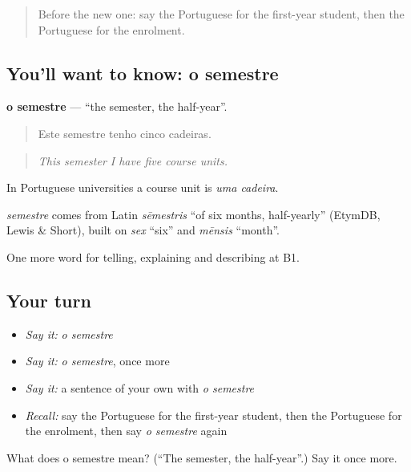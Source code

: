 \begin{quote}
Before the new one: say the Portuguese for the first-year student, then the Portuguese for the enrolment.
\end{quote}

\subsection*{You'll want to know: o semestre}
\textbf{o semestre} — \textquotedblleft{}the semester, the half-year\textquotedblright{}.

\begin{quote}
Este semestre tenho cinco cadeiras.
\end{quote}

\begin{quote}
\emph{This semester I have five course units.}
\end{quote}

In Portuguese universities a course unit is \emph{uma cadeira}.

\begin{cousinweb}
\emph{semestre} comes from Latin \emph{sēmestris} \textquotedblleft{}of six months, half-yearly\textquotedblright{} (EtymDB, Lewis \& Short), built on \emph{sex} \textquotedblleft{}six\textquotedblright{} and \emph{mēnsis} \textquotedblleft{}month\textquotedblright{}.
\end{cousinweb}

\begin{grammarlens}[title={What you've built}]
One more word for telling, explaining and describing at B1.
\end{grammarlens}

\subsection*{Your turn}
\begin{itemize}
\raggedright
  \item \emph{Say it:} \emph{o semestre}
  \item \emph{Say it:} \emph{o semestre}, once more
  \item \emph{Say it:} a sentence of your own with \emph{o semestre}
  \item \emph{Recall:} say the Portuguese for the first-year student, then the Portuguese for the enrolment, then say \emph{o semestre} again
\end{itemize}

\begin{tcolorbox}[breakable,colback=teal!4,colframe=teal!35!black,title={Before you move on}]
What does o semestre mean? (\textquotedblleft{}The semester, the half-year\textquotedblright{}.) Say it once more.
\end{tcolorbox}
